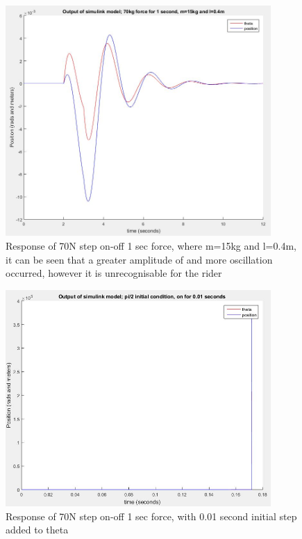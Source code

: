 \documentclass[12pt]{article}
\begin{document}
\begin{center}
\begin{figure}[htb]
	\includegraphics[width=0.9\textwidth]{PBA3_5_m15_l40.jpg}
\caption{Response of 70N step on-off 1 sec force, where m=15kg and l=0.4m, it can be seen that a greater amplitude of and more oscillation occurred, however it is unrecognisable for the rider}
\end{figure}
\end{center}


\begin{center}
\begin{figure}[htb]
	\includegraphics[width=0.9\textwidth]{PBA3_5_th_dist.jpg}
\caption{Response of 70N step on-off 1 sec force, with 0.01 second initial step added to theta}
\end{figure}
\end{center}
\end{document}
